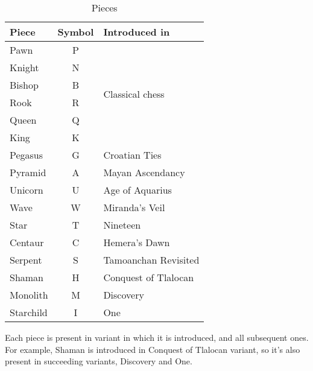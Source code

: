 \begin{table}[!h]
\centering
\begin{tabular}{ lcl }
\toprule %
\textbf{Piece} & \textbf{Symbol} & \textbf{Introduced in}           \\
\midrule %
Pawn           & P               & \multirow{6}{*}{Classical chess} \\
Knight         & N               &                                  \\
Bishop         & B               &                                  \\
Rook           & R               &                                  \\
Queen          & Q               &                                  \\
King           & K               &                                  \\
\cmidrule{1-3} %
Pegasus        & G               & Croatian Ties                    \\
Pyramid        & A               & Mayan Ascendancy                 \\
Unicorn        & U               & Age of Aquarius                  \\
Wave           & W               & Miranda's Veil                   \\
Star           & T               & Nineteen                         \\
Centaur        & C               & Hemera's Dawn                    \\
Serpent        & S               & Tamoanchan Revisited             \\
Shaman         & H               & Conquest of Tlalocan             \\
Monolith       & M               & Discovery                        \\
Starchild      & I               & One                              \\
\bottomrule %
\end{tabular}
\caption{Pieces}
\label{tbl:Appendix/Introduction/Pieces}
\end{table}

Each piece is present in variant in which it is introduced, and all subsequent ones.
For example, Shaman is introduced in Conquest of Tlalocan variant, so it's also present
in succeeding variants, Discovery and One.

